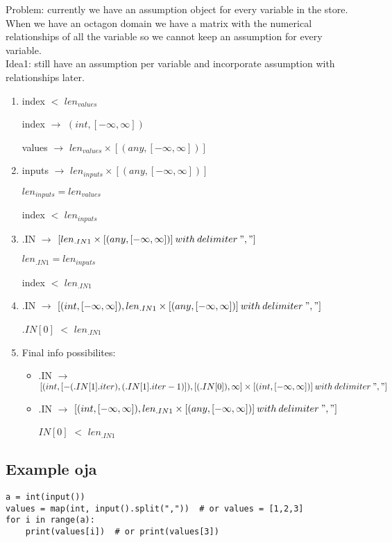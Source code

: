 \documentclass[11pt]{article}
\begin{document}
Problem: currently we have an assumption object for every variable in the store. When we have an octagon domain we have a matrix with the numerical relationships of all the variable so we cannot keep an assumption for every variable.\\
Idea1: still have an assumption per variable and incorporate assumption with relationships later.

\begin{enumerate}
  \item index $<$ $len_{values}$

  index $\rightarrow$ $(int, [-\infty, \infty])$

  values $\rightarrow$ $len_{values}\times[(any, [-\infty, \infty])]$

  \item inputs $\rightarrow$ $len_{inputs}\times[(any, [-\infty, \infty])]$

  $len_{inputs} = len_{values}$

  index $<$ $len_{inputs}$

  \item .IN $\rightarrow$ $[len_{.IN1}\times[(any, [-\infty, \infty])]\:with\:delimiter\:","]$

  $len_{.IN1} = len_{inputs}$

  index $<$ $len_{.IN1}$

  \item .IN $\rightarrow$ $[(int, [-\infty, \infty]), len_{.IN1}\times[(any, [-\infty, \infty])]\:with\:delimiter\:","]$

  $.IN[0]$ $<$ $len_{.IN1}$

  \item Final info possibilites:

  \begin{itemize}
    \item .IN $\rightarrow$ $[(int, [-(.IN[1].iter), (.IN[1].iter-1)]), [(.IN[0]), \infty]\times[(int, [-\infty, \infty])]\:with\:delimiter\:","]$
    
    \item .IN $\rightarrow$ $[(int, [-\infty, \infty]), len_{.IN1}\times[(any, [-\infty, \infty])]\:with\:delimiter\:","]$
    
    $IN[0]$ $<$ $len_{.IN1}$
  \end{itemize}
  
\end{enumerate}


\subsection{Example oja}
\begin{lstlisting}
a = int(input())
values = map(int, input().split(","))  # or values = [1,2,3]
for i in range(a):
    print(values[i])  # or print(values[3])
\end{lstlisting}
\end{document}

